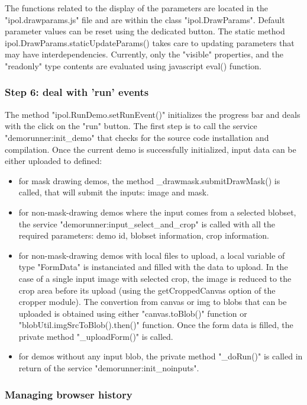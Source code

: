The functions related to the display of the parameters are located in the "ipol.drawparams.js"
file and are within the class "ipol.DrawParams". Default parameter values can be reset using
the dedicated button.
The static method ipol.DrawParams.staticUpdateParams() takes care to updating parameters
that may have interdependencies. Currently, only the "visible" properties, and the 
"readonly" type contents are evaluated using javascript eval() function.

\subsubsection{Step 6: deal with 'run' events}

The method "ipol.RunDemo.setRunEvent()" initializes the progress bar and deals
with the click on the "run" button.
The first step is to call the service "demorunner:init\_demo" that checks for the
source code installation and compilation. Once the current demo is successfully
initialized, input data can be either uploaded to defined:
\begin{itemize}
 \item for mask drawing demos, the method \_drawmask.submitDrawMask() is called,
        that will submit the inputs: image and mask.
 \item for non-mask-drawing demos where the input comes from a selected blobset,
        the service "demorunner:input\_select\_and\_crop" is called with all the
        required parameters: demo id, blobset information, crop information.
 \item for non-mask-drawing demos with local files to upload, a local variable
        of type "FormData" is instanciated and filled with the data to upload.
        In the case of a single input image with selected crop, the image
        is reduced to the crop area before its upload (using the getCroppedCanvas
        option of the cropper module). The convertion from canvas or img to 
        blobs that can be uploaded is obtained using either "canvas.toBlob()"
        function or "blobUtil.imgSrcToBlob().then()" function. Once the 
        form data is filled, the private method "\_uploadForm()" is called.
 \item for demos without any input blob, the private method "\_doRun()" is
        called in return of the service "demorunner:init\_noinputs".
\end{itemize}


\subsubsection{Managing browser history}

